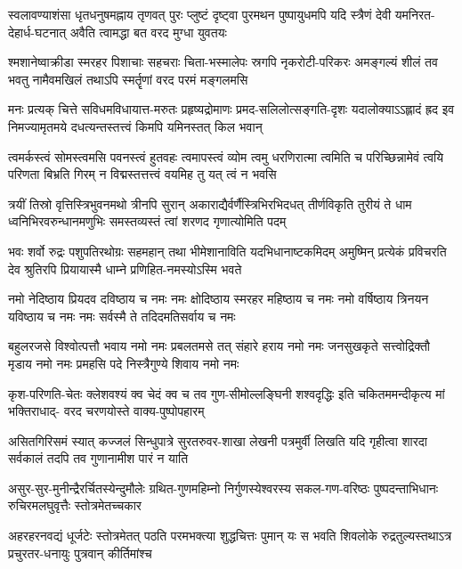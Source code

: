\fourlineindentedshloka
{स्वलावण्याशंसा धृतधनुषमह्नाय तृणवत्}
{पुरः प्लुष्टं दृष्ट्वा पुरमथन पुष्पायुधमपि}
{यदि स्त्रैणं देवी यमनिरत-देहार्ध-घटनात्}
{अवैति त्वामद्धा बत वरद मुग्धा युवतयः}%

\fourlineindentedshloka
{श्मशानेष्वाक्रीडा स्मरहर पिशाचाः सहचराः}
{चिता-भस्मालेपः स्रगपि नृकरोटी-परिकरः}
{अमङ्गल्यं शीलं तव भवतु नामैवमखिलं}
{तथाऽपि स्मर्तॄणां वरद परमं मङ्गलमसि}%

\fourlineindentedshloka
{मनः प्रत्यक् चित्ते सविधमविधायात्त-मरुतः}
{प्रहृष्यद्रोमाणः प्रमद-सलिलोत्सङ्गति-दृशः}
{यदालोक्याऽऽह्लादं ह्रद इव निमज्यामृतमये}
{दधत्यन्तस्तत्त्वं किमपि यमिनस्तत् किल भवान्}%

\fourlineindentedshloka
{त्वमर्कस्त्वं सोमस्त्वमसि पवनस्त्वं हुतवहः}
{त्वमापस्त्वं व्योम त्वमु धरणिरात्मा त्वमिति च}
{परिच्छिन्नामेवं त्वयि परिणता बिभ्रति गिरम्}
{न विद्मस्तत्तत्त्वं वयमिह तु यत् त्वं न भवसि}%

\fourlineindentedshloka
{त्रयीं तिस्रो वृत्तिस्त्रिभुवनमथो त्रीनपि सुरान्}
{अकाराद्यैर्वर्णैस्त्रिभिरभिदधत् तीर्णविकृति}
{तुरीयं ते धाम ध्वनिभिरवरुन्धानमणुभिः}
{समस्तव्यस्तं त्वां शरणद गृणात्योमिति पदम्}%

\fourlineindentedshloka
{भवः शर्वो रुद्रः पशुपतिरथोग्रः सहमहान्}
{तथा भीमेशानाविति यदभिधानाष्टकमिदम्}
{अमुष्मिन् प्रत्येकं प्रविचरति देव श्रुतिरपि}
{प्रियायास्मै धाम्ने प्रणिहित-नमस्योऽस्मि भवते}%

\fourlineindentedshloka
{नमो नेदिष्ठाय प्रियदव दविष्ठाय च नमः}
{नमः क्षोदिष्ठाय स्मरहर महिष्ठाय च नमः}
{नमो वर्षिष्ठाय त्रिनयन यविष्ठाय च नमः}
{नमः सर्वस्मै ते तदिदमतिसर्वाय च नमः}%

\fourlineindentedshloka
{बहुलरजसे विश्वोत्पत्तौ भवाय नमो नमः}
{प्रबलतमसे तत् संहारे हराय नमो नमः}
{जनसुखकृते सत्त्वोद्रिक्तौ मृडाय नमो नमः}
{प्रमहसि पदे निस्त्रैगुण्ये शिवाय नमो नमः}%

\fourlineindentedshloka
{कृश-परिणति-चेतः क्लेशवश्यं क्व चेदं}
{क्व च तव गुण-सीमोल्लङ्घिनी शश्वदृद्धिः}
{इति चकितममन्दीकृत्य मां भक्तिराधाद्-}
{वरद चरणयोस्ते वाक्य-पुष्पोपहारम्}%

\fourlineindentedshloka
{असितगिरिसमं स्यात् कज्जलं सिन्धुपात्रे}
{सुरतरुवर-शाखा लेखनी पत्रमुर्वी}
{लिखति यदि गृहीत्वा शारदा सर्वकालं}
{तदपि तव गुणानामीश पारं न याति}%

\fourlineindentedshloka
{असुर-सुर-मुनीन्द्रैरर्चितस्येन्दुमौलेः}
{ग्रथित-गुणमहिम्नो निर्गुणस्येश्वरस्य}
{सकल-गण-वरिष्ठः पुष्पदन्ताभिधानः}
{रुचिरमलघुवृत्तैः स्तोत्रमेतच्चकार}%

\fourlineindentedshloka
{अहरहरनवद्यं धूर्जटेः स्तोत्रमेतत्}
{पठति परमभक्त्या शुद्धचित्तः पुमान् यः}
{स भवति शिवलोके रुद्रतुल्यस्तथाऽत्र}
{प्रचुरतर-धनायुः पुत्रवान् कीर्तिमांश्च}%

